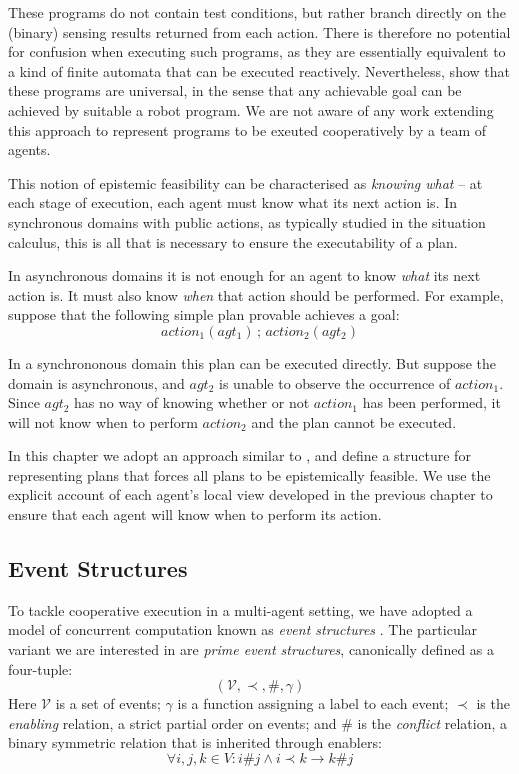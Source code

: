 These programs do not contain test conditions, but rather branch directly
on the (binary) sensing results returned from each action. There is
therefore no potential for confusion when executing such programs,
as they are essentially equivalent to a kind of finite automata that
can be executed reactively. Nevertheless, \citet{levesque98what_robots_can_do}
show that these programs are universal, in the sense that any achievable
goal can be achieved by suitable a robot program. We are not aware
of any work extending this approach to represent programs to be exeuted
cooperatively by a team of agents.

This notion of epistemic feasibility can be characterised as \emph{knowing
what} -- at each stage of execution, each agent must know what its
next action is. In synchronous domains with public actions, as typically
studied in the situation calculus, this is all that is necessary to
ensure the executability of a plan.

In asynchronous domains it is not enough for an agent to know \emph{what}
its next action is. It must also know \emph{when} that action should
be performed. For example, suppose that the following simple plan
provable achieves a goal:\[
action_{1}(agt_{1})\,;\, action_{2}(agt_{2})\]


In a synchrononous domain this plan can be executed directly. But
suppose the domain is asynchronous, and $agt_{2}$ is unable to observe
the occurrence of $action_{1}$. Since $agt_{2}$ has no way of knowing
whether or not $action_{1}$ has been performed, it will not know
when to perform $action_{2}$ and the plan cannot be executed.

In this chapter we adopt an approach similar to \citep{levesque98what_robots_can_do},
and define a structure for representing plans that forces all plans
to be epistemically feasible. We use the explicit account of each
agent's local view developed in the previous chapter to ensure that
each agent will know when to perform its action.


\subsection{Event Structures}

To tackle cooperative execution in a multi-agent setting, we have
adopted a model of concurrent computation known as \emph{event structures}
\citep{npw79event_structures}. The particular variant we are interested
in are \emph{prime event structures}, canonically defined as a four-tuple:\[
(\mathcal{V},\prec,\#,\gamma)\]
 Here $\mathcal{V}$ is a set of events; $\gamma$ is a function assigning
a label to each event; $\prec$ is the \emph{enabling} relation, a
strict partial order on events; and $\#$ is the \emph{conflict} relation,
a binary symmetric relation that is inherited through enablers:\[
\forall i,j,k\in V:i\#j\wedge i\prec k\rightarrow k\#j\]


